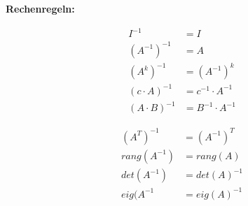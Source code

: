 {\textbf{Rechenregeln:} \par
\vspace{-2.5mm}
\begin{minipage}[t]{0.49 \columnwidth}
\begin{align}
I^{-1} &= I\nonumber \\
(A^{-1})^{-1} &= A \nonumber \\
(A^k)^{-1} &= (A^{-1})^k \nonumber \\
(c\cdot A)^{-1} &= c^{-1} \cdot A^{-1} \nonumber \\
(A\cdot B)^{-1} &= B^{-1} \cdot A^{-1} \nonumber
\end{align}
\end{minipage}
\begin{minipage}[t]{0.49 \columnwidth}
\begin{align}
(A^T)^{-1} &= (A^{-1})^T \nonumber \\
rang(A^{-1}) &= rang(A) \nonumber \\
det(A^{-1}) &= det(A)^{-1} \nonumber \\
eig(A^{-1} &= eig(A)^{-1} \nonumber 
\end{align}
\end{minipage}

}